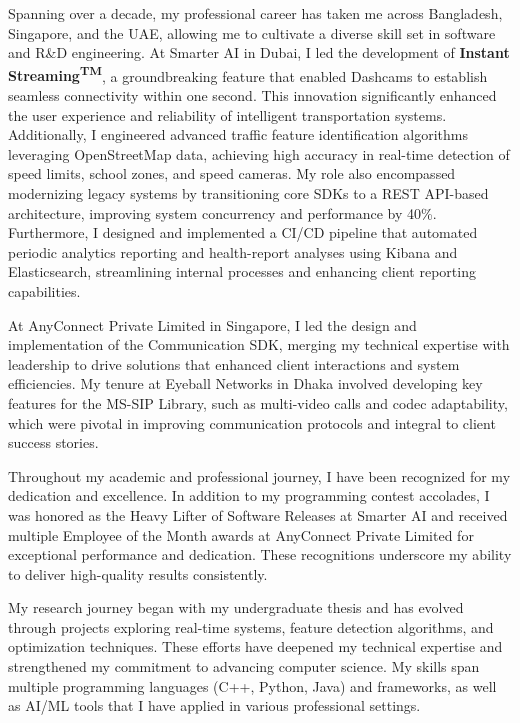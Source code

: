 \documentclass[11pt]{article}
\newif\ifshowsections
\begin{document}
Spanning over a decade, my professional career has taken me across Bangladesh, Singapore, and the UAE,
allowing me to cultivate a diverse skill set in software and R\&D engineering. At Smarter AI in Dubai,
I led the development of \textbf{Instant Streaming\textsuperscript{TM}}, a groundbreaking feature that enabled
Dashcams to establish seamless connectivity within one second. This innovation significantly enhanced the user
experience and reliability of intelligent transportation systems. Additionally, I engineered advanced traffic
feature identification algorithms leveraging OpenStreetMap data, achieving high accuracy in real-time detection
of speed limits, school zones, and speed cameras. My role also encompassed modernizing legacy systems by
transitioning core SDKs to a REST API-based architecture, improving system concurrency and performance by
40\%. Furthermore, I designed and implemented a CI/CD pipeline that automated periodic analytics reporting
and health-report analyses using Kibana and Elasticsearch, streamlining internal processes and enhancing
client reporting capabilities.

At AnyConnect Private Limited in Singapore, I led the design and implementation of the Communication SDK,
merging my technical expertise with leadership to drive solutions that enhanced client interactions and
system efficiencies. My tenure at Eyeball Networks in Dhaka involved developing key features for the MS-SIP
Library, such as multi-video calls and codec adaptability, which were pivotal in improving communication
protocols and integral to client success stories.

Throughout my academic and professional journey, I have been recognized for my dedication and excellence.
In addition to my programming contest accolades, I was honored as the Heavy Lifter of Software Releases at Smarter
AI and received multiple Employee of the Month awards at AnyConnect Private Limited for exceptional performance
and dedication. These recognitions underscore my ability to deliver high-quality results consistently.

\ifshowsections\section*{Research Interests}\fi

My research journey began with my undergraduate thesis and has evolved through projects exploring real-time
systems, feature detection algorithms, and optimization techniques. These efforts have deepened my technical
expertise and strengthened my commitment to advancing computer science. My skills span multiple programming
languages (C++, Python, Java) and frameworks, as well as AI/ML tools that I have applied in various professional
settings.
\end{document}
